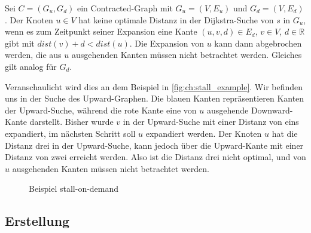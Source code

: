 \begin{definition}
  Sei $C = (G_u, G_d)$ ein Contracted-Graph mit $G_u = (V, E_u)$ und $G_d = (V, E_d)$.
  Der Knoten $u \in V$ hat keine optimale Distanz in der Dijkstra-Suche von $s$ in $G_u$, wenn es zum Zeitpunkt seiner Expansion eine Kante $(u, v, d) \in E_d$, $v \in V$, $d \in \mathbb{R}$ gibt mit ${dist}(v) + d < {dist}(u)$.
  Die Expansion von $u$ kann dann abgebrochen werden, die aus $u$ ausgehenden Kanten müssen nicht betrachtet werden.
  Gleiches gilt analog für $G_d$.
\end{definition}

Veranschaulicht wird dies an dem Beispiel in \autoref{fig:ch:stall_example}.
Wir befinden uns in der Suche des Upward-Graphen.
Die blauen Kanten repräsentieren Kanten der Upward-Suche, während die rote Kante eine von $u$ ausgehende Downward-Kante darstellt.
Bisher wurde $v$ in der Upward-Suche mit einer Distanz von eins expandiert, im nächsten Schritt soll $u$ expandiert werden.
Der Knoten $u$ hat die Distanz drei in der Upward-Suche, kann jedoch über die Upward-Kante mit einer Distanz von zwei erreicht werden.
Also ist die Distanz drei nicht optimal, und von $u$ ausgehenden Kanten müssen nicht betrachtet werden.

\begin{figure}
  \centering
  \caption{Beispiel stall-on-demand}
  \label{fig:ch:stall_example}
\end{figure}

\subsection{Erstellung}

